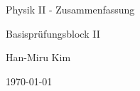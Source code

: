 
\begin{titlepage} %

	\Large %

	\centering %
	
	\vspace*{5\baselineskip} %
    
	
	\vspace{0.75\baselineskip} %
	

	{\huge Physik II - Zusammenfassung}
	
	\vspace{0.75\baselineskip} %
	

	\vspace{1\baselineskip}

	Basisprüfungsblock II

	\vspace*{2\baselineskip} %
	

	\vspace{1\baselineskip}

	
	\vspace{0.5\baselineskip} %
	
	Han-Miru Kim
	
	\vspace{0.5\baselineskip} %
	
	
	\today %

\end{titlepage}